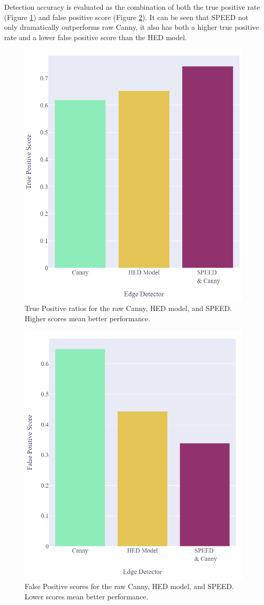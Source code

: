 \documentclass[conference]{IEEEtran}
\begin{document}
Detection accuracy is evaluated as the combination of both the true positive rate (Figure \ref{fig:edgeDetectors_positive}) and false positive score (Figure \ref{fig:edgeDetectors_negative}). It can be seen that SPEED not only dramatically outperforms raw Canny, it also has both a higher true positive rate and a lower false positive score than the HED model.

\begin{figure}
\centerline{\includegraphics[width=0.8\linewidth]{exp1_1.PNG}}
\caption{True Positive ratios for the raw Canny, HED model, and SPEED. Higher scores mean better performance.}
\label{fig:edgeDetectors_positive}
\end{figure}

\begin{figure}
\centerline{\includegraphics[width=0.8\linewidth]{exp1_2.PNG}}
\caption{False Positive scores for the raw Canny, HED model, and SPEED. Lower scores mean better performance.}
\label{fig:edgeDetectors_negative}
\end{figure}
\end{document}
